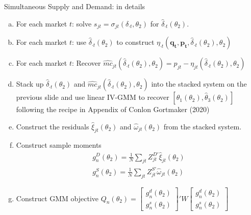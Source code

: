 \documentclass[aspectratio=169,10pt]{beamer}
\begin{document}
\begin{frame}{Simultaneous Supply and Demand: in details}
\footnotesize
\begin{enumerate}[(a)]
\item For each market $t$: solve $s_{jt} = \sigma_{jt}(\delta_{\cdot t},\theta_2)$ for $\widehat{\delta}_{\cdot t}(\theta_2)$.
\item For each market $t$: use $\widehat{\delta}_{\cdot t}(\theta_2)$ to construct $\eta_{\cdot 
t}(\symbf{q_t},\symbf{p_t},\widehat{\delta}_{\cdot t}(\theta_2),\theta_2)$
\item For each market $t$: Recover $\widehat{mc}_{jt}(\widehat{\delta}_{\cdot t}(\theta_2),\theta_2) = p_{jt} - \eta_{jt}(\widehat{\delta}_{\cdot t}(\theta_2),\theta_2)$
\item Stack up $\widehat{\delta}_{\cdot t}(\theta_2)$ and $\widehat{mc}_{jt}(\widehat{\delta}_{\cdot t}(\theta_2),\theta_2)$ into the stacked system on the previous slide and use linear IV-GMM to recover $[\widehat{\theta}_1(\theta_2), \widehat{\theta}_3(\theta_2) ]$ following the recipe in Appendix of Conlon Gortmaker (2020)
\item Construct the residuals $\widehat{\xi}_{jt}(\theta_2)$ and $\widehat{\omega}_{jt}(\theta_2)$ from the stacked system.
\item Construct sample moments
\begin{align*}
\nonumber g_n^D(\theta_2)=\frac{1}{N} \sum_{jt} Z_{jt}^{D\prime} \widehat{\xi}_{jt}(\theta_2)\\
 g_n^S(\theta_2)=\frac{1}{N} \sum_{jt} Z_{jt}^{S \prime} \widehat{\omega}_{jt}(\theta_2)
\end{align*}
\item Construct GMM objective $Q_n(\theta_2)= \left[ {\begin{array}{c} g_n^d(\theta_2) \\ g_n^s(\theta_2) \end{array} } \right]' W  \left[ {\begin{array}{c} g_n^d(\theta_2) \\ g_n^s(\theta_2) \end{array} } \right] $
\end{enumerate}
\end{frame}
\end{document}
